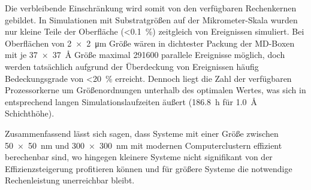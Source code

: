 Die verbleibende Einschränkung wird somit von den verfügbaren Rechenkernen gebildet.
In Simulationen mit Substratgrößen auf der Mikrometer-Skala wurden nur kleine Teile der Oberfläche (\SI{<0.1}{\percent}) zeitgleich von Ereignissen simuliert.
Bei Oberflächen von \SI{2x2}{\micro\meter} Größe wären in dichtester Packung der MD-Boxen mit je \SI{37x37}{\angstrom} Größe maximal \num{291600} parallele Ereignisse möglich, doch werden tatsächlich aufgrund der Überdeckung von Ereignissen häufig Bedeckungsgrade von \SI{<20}{\percent} erreicht.
Dennoch liegt die Zahl der verfügbaren Prozessorkerne um Größenordnungen unterhalb des optimalen Wertes, was sich in entsprechend langen Simulationslaufzeiten äußert (\SI{186.8}{\hour} für \SI{1.0}{\angstrom} Schichthöhe).

Zusammenfassend lässt sich sagen, dass Systeme mit einer Größe zwischen \SI{50x50}{\nano\meter} und \SI{300x300}{\nano\meter} mit modernen Computerclustern effizient berechenbar sind, wo hingegen kleinere Systeme nicht signifikant von der Effizienzsteigerung profitieren können und für größere Systeme die notwendige Rechenleistung unerreichbar bleibt.

